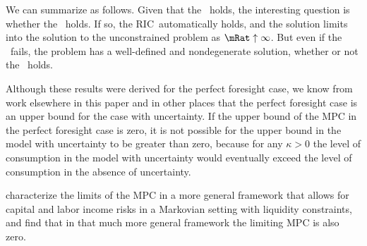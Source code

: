 \documentclass[\econtexRoot/BufferStockTheory]{subfiles}
\begin{document}
We can summarize as follows.  Given that the \PFGIC~holds, the
interesting question is whether the \FHWC~holds.  If so, the
RIC~automatically holds, and the solution limits
into the solution to the unconstrained problem as $\mRat \uparrow
\infty$.  But even if the \FHWC~fails, the problem has a
well-defined and nondegenerate solution, whether or not the \RIC~holds.

Although these results were derived for the perfect foresight case,
we know from work elsewhere in this paper and in other places that the
perfect foresight case is an upper bound for the case with uncertainty.
If the upper bound of the MPC in the perfect foresight case is zero, it
is not possible for the upper bound in the model with uncertainty to be
greater than zero, because for any $\kappa > 0$ the level of consumption
in the model with uncertainty would eventually exceed the level of consumption
in the absence of uncertainty.

\cite{maTodaRich} characterize the limits of the MPC in a more general framework that allows for capital and labor income risks in a Markovian setting with liquidity constraints, and find that in that much more general framework the limiting MPC is also zero.

\onlyinsubfile{\pagebreak}
\end{document}

